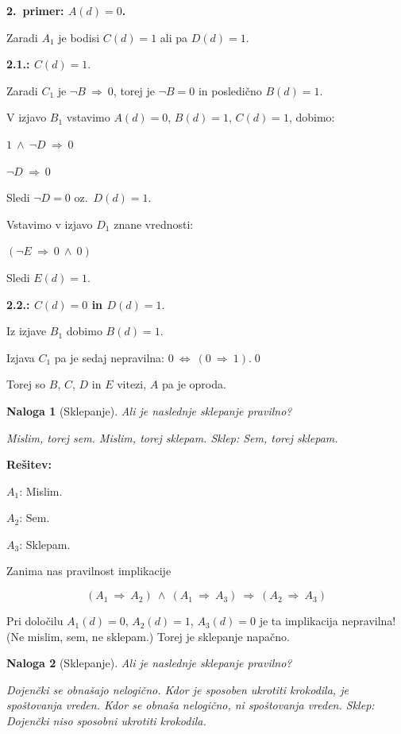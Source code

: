 \documentclass[11pt,paper=b5,footinclude,headinclude]{scrbook} %
\def\inn {{~\wedge~}}
\def\sledi {{~\Rightarrow~}}
\def\cee {{~\Leftrightarrow~}}
\newtheorem*{problem}{Naloga}
\begin{document}
\textbf{2.~primer: $A(d) = 0$.}

Zaradi $A_1$ je bodisi $C(d) = 1$ ali pa $D(d) = 1$.

\textbf{2.1.: $C(d) = 1$}.

Zaradi $C_1$ je $\neg B \sledi 0$, torej je $\neg B = 0$ in posledično $B(d) = 1$.

V izjavo $B_1$ vstavimo $A(d) = 0$, $B(d) = 1$, $C(d) = 1$, dobimo:

$1 \inn \neg D\sledi 0$

$\neg D\sledi 0$

Sledi $\neg D = 0$ oz.~$D(d) = 1$.

Vstavimo v izjavo $D_1$ znane vrednosti:

$(\neg E \sledi 0 \inn 0)$

Sledi $E(d) = 1$.

\bigskip

\textbf{2.2.: $C(d) = 0$ in $D(d) = 1$}.

Iz izjave $B_1$ dobimo $B(d) = 1$.

Izjava $C_1$ pa je sedaj nepravilna:
$0 \cee (0\sledi 1)$.\qed

Torej so $B$, $C$, $D$ in $E$ vitezi, $A$ pa je oproda.


\bigskip
\begin{problem}[Sklepanje]
Ali je naslednje sklepanje pravilno?

Mislim, torej sem. Mislim, torej sklepam. Sklep: Sem, torej sklepam.
\end{problem}

\textbf{Rešitev:}

$A_1$: Mislim.

$A_2$: Sem.

$A_3$: Sklepam.

Zanima nas pravilnost implikacije

$$(A_1\sledi A_2)\inn(A_1\sledi A_3)\sledi(A_2\sledi A_3)$$

Pri določilu $A_1(d) = 0$, $A_2(d) = 1$, $A_3(d) = 0$ je ta implikacija nepravilna!
(Ne mislim, sem, ne sklepam.)
Torej je sklepanje napačno.

\bigskip

\begin{problem}[Sklepanje]
Ali je naslednje sklepanje pravilno?

Dojenčki se obnašajo nelogično. Kdor je sposoben ukrotiti krokodila, je spoštovanja vreden.
Kdor se obnaša nelogično, ni spoštovanja vreden. Sklep: Dojenčki niso sposobni ukrotiti krokodila.
\end{problem}
\end{document}
